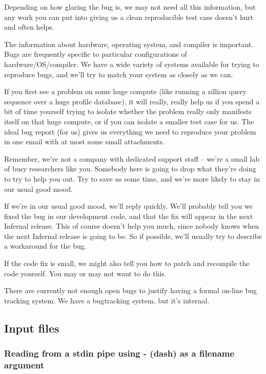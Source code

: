 Depending on how glaring the bug is, we may not need all this
information, but any work you can put into giving us a clean
reproducible test case doesn't hurt and often helps.

The information about hardware, operating system, and compiler is
important. Bugs are frequently specific to particular configurations
of hardware/OS/compiler.  We have a wide variety of systems available
for trying to reproduce bugs, and we'll try to match your system as
closely as we can.

If you first see a problem on some huge compute (like running a
zillion query sequence over a huge profile database), it will really,
really help us if you spend a bit of time yourself trying to isolate
whether the problem really only manifests itself on that huge compute,
or if you can isolate a smaller test case for us. The ideal bug report
(for us) gives us everything we need to reproduce your problem in one
email with at most some small attachments. 

Remember, we're not a company with dedicated support staff -- we're a
small lab of busy researchers like you. Somebody here is going to drop
what they're doing to try to help you out. Try to save us some time,
and we're more likely to stay in our usual good mood.

If we're in our usual good mood, we'll reply quickly.  We'll probably
tell you we fixed the bug in our development code, and that the fix
will appear in the next Infernal release. This of course doesn't help you
much, since nobody knows when the next Infernal release is going to be.
So if possible, we'll usually try to describe a workaround for the
bug.

If the code fix is small, we might also tell you how to patch and
recompile the code yourself. You may or may not want to do this.

There are currently not enough open bugs to justify having a formal
on-line bug tracking system. We have a bugtracking system, but it's
internal.

\subsection{Input files}

\subsubsection{Reading from a stdin pipe using - (dash) as a filename argument}

